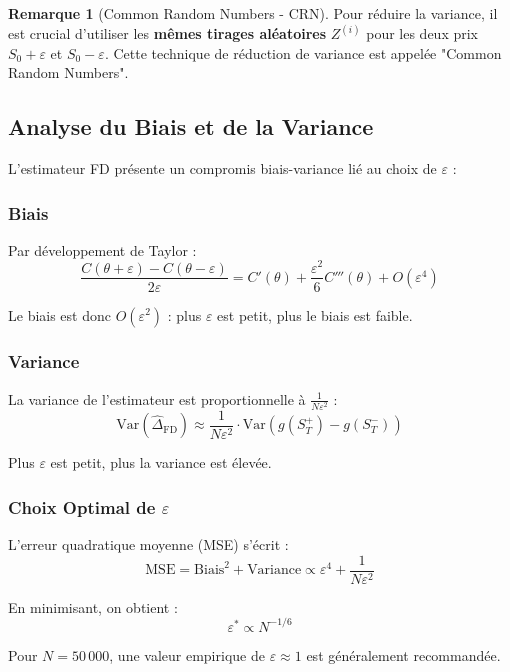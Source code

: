 \documentclass[a4paper,11pt]{article}
\theoremstyle{definition}
\newtheorem{remarque}{Remarque}[section]
\begin{document}
\begin{remarque}[Common Random Numbers - CRN]
Pour réduire la variance, il est crucial d'utiliser les \textbf{mêmes tirages aléatoires} $Z^{(i)}$ pour les deux prix $S_0 + \varepsilon$ et $S_0 - \varepsilon$. Cette technique de réduction de variance est appelée "Common Random Numbers".
\end{remarque}

\subsection{Analyse du Biais et de la Variance}

L'estimateur FD présente un compromis biais-variance lié au choix de $\varepsilon$ :

\subsubsection{Biais}

Par développement de Taylor :
$$\frac{C(\theta + \varepsilon) - C(\theta - \varepsilon)}{2\varepsilon} = C'(\theta) + \frac{\varepsilon^2}{6} C'''(\theta) + O(\varepsilon^4)$$

Le biais est donc $O(\varepsilon^2)$ : plus $\varepsilon$ est petit, plus le biais est faible.

\subsubsection{Variance}

La variance de l'estimateur est proportionnelle à $\frac{1}{N\varepsilon^2}$ :
$$\text{Var}(\hat{\Delta}_{\text{FD}}) \approx \frac{1}{N\varepsilon^2} \cdot \text{Var}(g(S_T^+) - g(S_T^-))$$

Plus $\varepsilon$ est petit, plus la variance est élevée.

\subsubsection{Choix Optimal de $\varepsilon$}

L'erreur quadratique moyenne (MSE) s'écrit :
$$\text{MSE} = \text{Biais}^2 + \text{Variance} \propto \varepsilon^4 + \frac{1}{N\varepsilon^2}$$

En minimisant, on obtient :
$$\varepsilon^* \propto N^{-1/6}$$

Pour $N = 50\,000$, une valeur empirique de $\varepsilon \approx 1$ est généralement recommandée.
\end{document}
